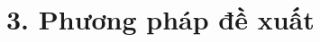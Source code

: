 \documentclass[../main.tex]{subfiles}
\begin{document}
\section{3. Phương pháp đề xuất}

\end{document}

